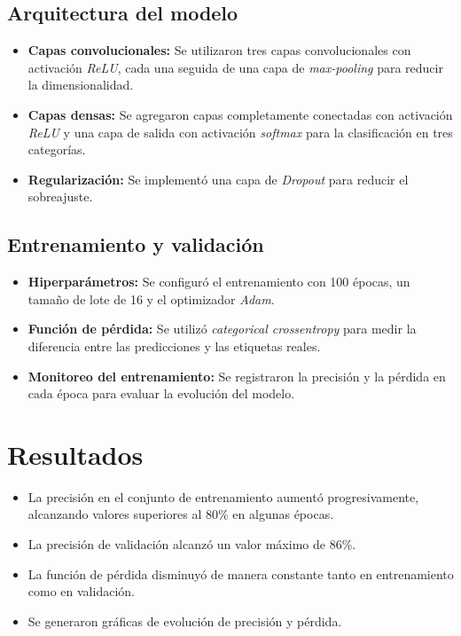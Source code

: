 \documentclass[conference]{IEEEtran}
\begin{document}
\FloatBarrier



\subsection{Arquitectura del modelo}

\begin{itemize}
    \item \textbf{Capas convolucionales:} Se utilizaron tres capas convolucionales con activación \textit{ReLU}, cada una seguida de una capa de \textit{max-pooling} para reducir la dimensionalidad.

    \item \textbf{Capas densas:} Se agregaron capas completamente conectadas con activación \textit{ReLU} y una capa de salida con activación \textit{softmax} para la clasificación en tres categorías.

    \item \textbf{Regularización:} Se implementó una capa de \textit{Dropout} para reducir el sobreajuste.
\end{itemize}



\subsection{Entrenamiento y validación}

\begin{itemize}
    \item \textbf{Hiperparámetros:} Se configuró el entrenamiento con 100 épocas, un tamaño de lote de 16 y el optimizador \textit{Adam}.
    
    \item \textbf{Función de pérdida:} Se utilizó \textit{categorical crossentropy} para medir la diferencia entre las predicciones y las etiquetas reales.

    \item \textbf{Monitoreo del entrenamiento:} Se registraron la precisión y la pérdida en cada época para evaluar la evolución del modelo.
\end{itemize}



\section{Resultados}

\begin{itemize}
    \item La precisión en el conjunto de entrenamiento aumentó progresivamente, alcanzando valores superiores al 80\% en algunas épocas.
    
    \item La precisión de validación alcanzó un valor máximo de 86\%.

    \item La función de pérdida disminuyó de manera constante tanto en entrenamiento como en validación.

    \item Se generaron gráficas de evolución de precisión y pérdida.
\end{itemize}
\end{document}
